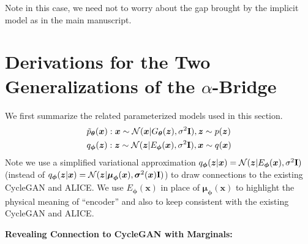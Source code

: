 \documentclass[letterpaper]{article} %
\newcommand{\beq}{\begin{equation}}
\newcommand{\eeq}{\end{equation}}
\newcommand{\bali}{\begin{aligned}}
\newcommand{\eali}{\end{aligned}}
\newcommand{\Nc}[0]{\ensuremath{\mathcal{N}} }
\newcommand{\Imat}[0]{\ensuremath{{\bf I}} }
\newcommand{\xv}[0]{\ensuremath{\boldsymbol{x}} }
\newcommand{\zv}[0]{\ensuremath{\boldsymbol{z}} }
\newcommand{\thetav}[0]{\ensuremath{\boldsymbol{\theta}} }
\newcommand{\muv}[0]{\ensuremath{\boldsymbol{\mu}} }
\newcommand{\sigmav}[0]{\ensuremath{\boldsymbol{\sigma}} }
\newcommand{\phiv}[0]{\ensuremath{\boldsymbol{\phi}} }
\begin{document}
Note in this case, we need not to worry about the gap brought by the implicit model as in the main manuscript. %



\section{Derivations for the Two Generalizations of the $\alpha$-Bridge}
\label{sec:Two_connections_cycle}


We first summarize the related parameterized models used in this section. 
\beq
\bali
    & \tilde p_{\thetav}(\xv): \xv \sim \Nc(\xv | G_{\thetav}(\zv), \sigma^2 \Imat), \zv \sim p(\zv)
    \\
    & q_{\phiv}(\zv): \zv \sim \Nc(\zv | E_{\phiv}(\xv), \sigma^2 \Imat), \xv \sim q(\xv)
\eali
\eeq
Note we use a simplified variational approximation $ q_{\phiv}(\zv|\xv) = \Nc(\zv | E_{\phiv}(\xv), \sigma^2 \Imat)$ (instead of $q_{\phiv}(\zv|\xv) = \Nc(\zv | \muv_{\phiv}(\xv), \sigmav^2 (\xv) \Imat)$) to draw connections to the existing CycleGAN and ALICE. We use $E_{\phiv}(\xv)$ in place of $\muv_{\phiv}(\xv)$ to highlight the physical meaning of ``encoder'' and also to keep consistent with the existing CycleGAN and ALICE.


\textbf{Revealing Connection to CycleGAN with Marginals:}
\end{document}

